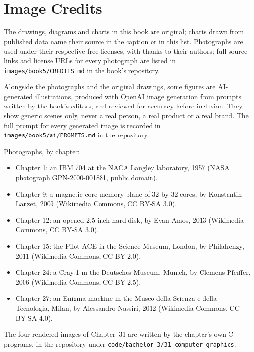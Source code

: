 \chapter*{Image Credits}

The drawings, diagrams and charts in this book are original; charts drawn
from published data name their source in the caption or in this list.
Photographs are used under their respective free licenses, with thanks to
their authors; full source links and license URLs for every photograph are
listed in \texttt{images/book5/CREDITS.md} in the book's repository.

\bigskip
Alongside the photographs and the original drawings, some figures are
AI-generated illustrations, produced with OpenAI image generation from
prompts written by the book's editors, and reviewed for accuracy before
inclusion. They show generic scenes only, never a real person, a real
product or a real brand. The full prompt for every generated image is
recorded in \texttt{images/book5/ai/PROMPTS.md} in the repository.

\bigskip
\noindent Photographs, by chapter:
\begin{itemize}\small
  \item Chapter 1: an IBM 704 at the NACA Langley laboratory, 1957 (NASA photograph GPN-2000-001881, public domain).
  \item Chapter 9: a magnetic-core memory plane of 32 by 32 cores, by Konstantin Lanzet, 2009 (Wikimedia Commons, CC BY-SA 3.0).
  \item Chapter 12: an opened 2.5-inch hard disk, by Evan-Amos, 2013 (Wikimedia Commons, CC BY-SA 3.0).
  \item Chapter 15: the Pilot ACE in the Science Museum, London, by Philafrenzy, 2011 (Wikimedia Commons, CC BY 2.0).
  \item Chapter 24: a Cray-1 in the Deutsches Museum, Munich, by Clemens Pfeiffer, 2006 (Wikimedia Commons, CC BY 2.5).
  \item Chapter 27: an Enigma machine in the Museo della Scienza e della Tecnologia, Milan, by Alessandro Nassiri, 2012 (Wikimedia Commons, CC BY-SA 4.0).
\end{itemize}

\noindent The four rendered images of Chapter~31 are written by the chapter's own C programs, in the repository under \texttt{code/bachelor-3/31-computer-graphics}.
